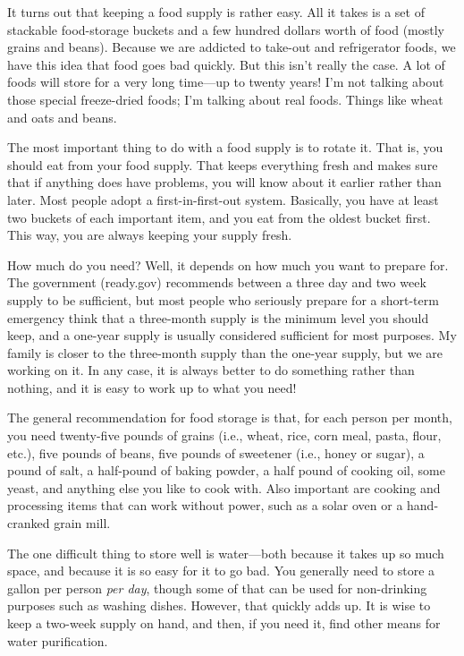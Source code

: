 It turns out that keeping a food supply is rather easy. All it takes is
a set of stackable food-storage buckets and a few hundred dollars worth
of food (mostly grains and beans). Because we are addicted to take-out
and refrigerator foods, we have this idea that food goes bad quickly.
But this isn’t really the case. A lot of foods will store for a very
long time—up to twenty years!  I’m not talking about those special
freeze-dried foods; I’m talking about real foods. Things like wheat and
oats and beans.

The most important thing to do with a food supply is to rotate it. That
is, you should eat from your food supply. That keeps everything fresh
and makes sure that if anything does have problems, you will know about
it earlier rather than later. Most people adopt a first-in-first-out
system. Basically, you have at least two buckets of each important
item, and you eat from the oldest bucket first. This way, you are
always keeping your supply fresh.

How much do you need?  Well, it depends on how much you want to prepare
for. The government (ready.gov) recommends between a three day and two week supply to be
sufficient, but most people who seriously prepare for a short-term
emergency think that a three-month supply is the minimum level you
should keep, and a one-year supply is usually considered sufficient for
most purposes. My family is closer to the three-month supply than the
one-year supply, but we are working on it. In any case, it is always
better to do something rather than nothing, and it is easy to work up
to what you need!  

The general recommendation for food storage is that, for each person
per month, you need
twenty-five pounds of grains (i.e., wheat, rice, corn meal, pasta,
flour, etc.), five pounds of beans, five pounds of sweetener (i.e.,
honey or sugar), a pound of salt, a half-pound of baking powder, a half
pound of cooking oil, some yeast, and anything else you like to cook
with. Also important are cooking and processing items that can work
without power, such as a solar oven or a hand-cranked grain mill.

The one difficult thing to store well is water—both because it takes up
so much space, and because it is so easy for it to go bad. You
generally need to store a gallon per person \textit{per day}, though
some of that can be used for non-drinking purposes such as washing
dishes. However, that quickly adds up. It is wise to keep a two-week
supply on hand, and then, if you need it, find other means for water
purification. 

